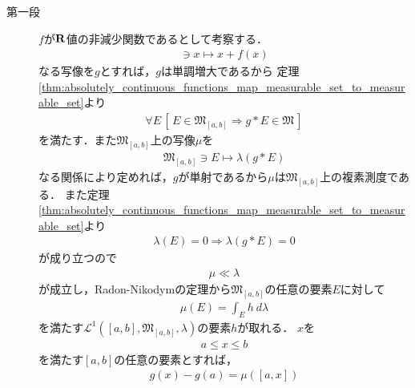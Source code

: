	\begin{sketch}\mbox{}
		\begin{description}
			\item[第一段]
				$f$が$\mathbf{R}$値の非減少関数であるとして考察する．
				\begin{align}
					[a,b] \ni x \longmapsto x + f(x)
				\end{align}
				なる写像を$g$とすれば，$g$は単調増大であるから
				定理\ref{thm:absolutely_continuous_functions_map_measurable_set_to_measurable_set}より
				\begin{align}
					\forall E\, \left[\, E \in \mathfrak{M}_{[a,b]} \Longrightarrow g \ast E \in \mathfrak{M}\, \right]
				\end{align}
				を満たす．また$\mathfrak{M}_{[a,b]}$上の写像$\mu$を
				\begin{align}
					\mathfrak{M}_{[a,b]} \ni E \longmapsto \lambda(g \ast E)
				\end{align}
				なる関係により定めれば，$g$が単射であるから$\mu$は$\mathfrak{M}_{[a,b]}$上の複素測度である．
				また定理\ref{thm:absolutely_continuous_functions_map_measurable_set_to_measurable_set}より
				\begin{align}
					\lambda(E) = 0 \Longrightarrow \lambda(g \ast E) = 0
				\end{align}
				が成り立つので
				\begin{align}
					\mu \ll \lambda
				\end{align}
				が成立し，Radon-Nikodymの定理から$\mathfrak{M}_{[a,b]}$の任意の要素$E$に対して
				\begin{align}
					\mu(E) = \int_E h\ d\lambda
				\end{align}
				を満たす$\mathscr{L}^1([a,b],\mathfrak{M}_{[a,b]},\lambda)$の要素$h$が取れる．
				$x$を
				\begin{align}
					a \leq x \leq b
				\end{align}
				を満たす$[a,b]$の任意の要素とすれば，
				\begin{align}
					g(x) - g(a) = \mu([a,x])
				\end{align}
		\end{description}
	\end{sketch}